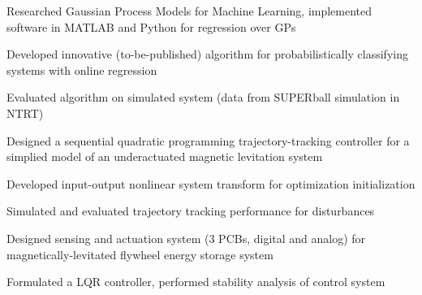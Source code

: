 \documentclass[12pt,letterpaper]{deedy-resume} %
\begin{document}
\begin{minipage}[t]{1\textwidth}
\begin{tightitemize}
\item Researched Gaussian Process Models for Machine Learning, implemented software in MATLAB and Python for regression over GPs

\item Developed innovative (to-be-published) algorithm for probabilistically classifying systems with online regression

\item Evaluated algorithm on simulated system (data from SUPERball simulation in NTRT)

\end{tightitemize}

\sectionspace


\begin{tightitemize}

\item Designed a sequential quadratic programming trajectory-tracking controller for a simplied model of an underactuated magnetic levitation system

\item Developed input-output nonlinear system transform for optimization initialization

\item Simulated and evaluated trajectory tracking performance for disturbances

\end{tightitemize}

\sectionspace %



\begin{tightitemize}

\item Designed sensing and actuation system (3 PCBs, digital and analog) for magnetically-levitated flywheel energy storage system

\item Formulated a LQR controller, performed stability analysis of control system

\end{tightitemize}

\sectionspace %

\end{minipage} %
\end{document}
